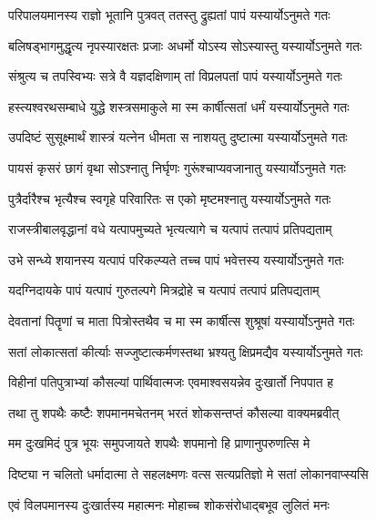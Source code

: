 \twolineshloka
{परिपालयमानस्य राज्ञो भूतानि पुत्रवत्}
{ततस्तु द्रुह्यतां पापं यस्यार्योऽनुमते गतः} %

\twolineshloka
{बलिषड्भागमुद्धृत्य नृपस्यारक्षतः प्रजाः}
{अधर्मो योऽस्य सोऽस्यास्तु यस्यार्योऽनुमते गतः} %

\twolineshloka
{संश्रुत्य च तपस्विभ्यः सत्रे वै यज्ञदक्षिणाम्}
{तां विप्रलपतां पापं यस्यार्योऽनुमते गतः} %

\twolineshloka
{हस्त्यश्वरथसम्बाधे युद्धे शस्त्रसमाकुले}
{मा स्म कार्षीत्सतां धर्मं यस्यार्योऽनुमते गतः} %

\twolineshloka
{उपदिष्टं सुसूक्ष्मार्थं शास्त्रं यत्नेन धीमता}
{स नाशयतु दुष्टात्मा यस्यार्योऽनुमते गतः} %

\twolineshloka
{पायसं कृसरं छागं वृथा सोऽश्नातु निर्घृणः}
{गुरूंश्चाप्यवजानातु यस्यार्योऽनुमते गतः} %

\twolineshloka
{पुत्रैर्दारैश्च भृत्यैश्च स्वगृहे परिवारितः}
{स एको मृष्टमश्नातु यस्यार्योऽनुमते गतः} %

\twolineshloka
{राजस्त्रीबालवृद्धानां वधे यत्पापमुच्यते}
{भृत्यत्यागे च यत्पापं तत्पापं प्रतिपद्यताम्} %

\twolineshloka
{उभे सन्ध्ये शयानस्य यत्पापं परिकल्प्यते}
{तच्च पापं भवेत्तस्य यस्यार्योऽनुमते गतः} %

\twolineshloka
{यदग्निदायके पापं यत्पापं गुरुतल्पगे}
{मित्रद्रोहे च यत्पापं तत्पापं प्रतिपद्यताम्} %

\twolineshloka
{देवतानां पितॄणां च माता पित्रोस्तथैव च}
{मा स्म कार्षीत्स शुश्रूषां यस्यार्योऽनुमते गतः} %

\twolineshloka
{सतां लोकात्सतां कीर्त्याः सज्जुष्टात्कर्मणस्तथा}
{भ्रश्यतु क्षिप्रमद्यैव यस्यार्योऽनुमते गतः} %

\twolineshloka
{विहीनां पतिपुत्राभ्यां कौसल्यां पार्थिवात्मजः}
{एवमाश्वसयन्नेव दुःखार्तो निपपात ह} %

\twolineshloka
{तथा तु शपथैः कष्टैः शपमानमचेतनम्}
{भरतं शोकसन्तप्तं कौसल्या वाक्यमब्रवीत्} %

\twolineshloka
{मम दुःखमिदं पुत्र भूयः समुपजायते}
{शपथैः शपमानो हि प्राणानुपरुणत्सि मे} %

\twolineshloka
{दिष्ट्या न चलितो धर्मादात्मा ते सहलक्ष्मणः}
{वत्स सत्यप्रतिज्ञो मे सतां लोकानवाप्स्यसि} %

\twolineshloka
{एवं विलपमानस्य दुःखार्तस्य महात्मनः}
{मोहाच्च शोकसंरोधाद्बभूव लुलितं मनः} %

